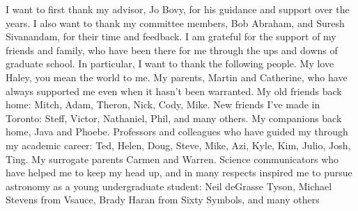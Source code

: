 \begin{acknowledgements}
    I want to first thank my advisor, Jo Bovy, for his guidance and support over the years. I also want to thank my committee members, Bob Abraham, and Suresh Sivanandam, for their time and feedback. I am grateful for the support of my friends and family, who have been there for me through the ups and downs of graduate school. In particular, I want to thank the following people. My love Haley, you mean the world to me. My parents, Martin and Catherine, who have always supported me even when it hasn't been warranted. My old friends back home: Mitch, Adam, Theron, Nick, Cody, Mike. New friends I've made in Toronto: Steff, Victor, Nathaniel, Phil, and many others. My companions back home, Java and Phoebe. Professors and colleagues who have guided my through my academic career: Ted, Helen, Doug, Steve, Mike, Azi, Kyle, Kim, Julio, Josh, Ting. My surrogate parents Carmen and Warren. Science communicators who have helped me to keep my head up, and in many respects inspired me to pursue astronomy as a young undergraduate student: Neil deGrasse Tyson, Michael Stevens from Vsauce, Brady Haran from Sixty Symbols, and many others
\end{acknowledgements}